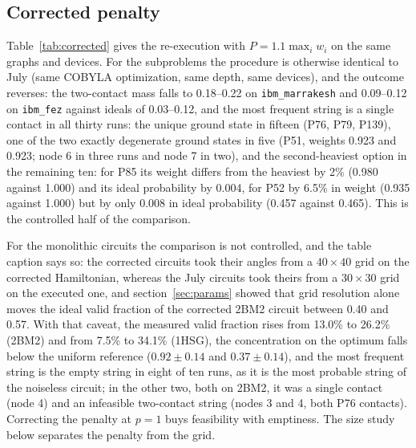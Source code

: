 \documentclass{iopjournal}
\begin{document}
\subsection{Corrected penalty}
\label{sec:res_corr}
Table~\ref{tab:corrected} gives the re-execution with $P = 1.1\max_i w_i$ on the same graphs and devices. For the subproblems the procedure is otherwise identical to July (same COBYLA optimization, same depth, same devices), and the outcome reverses: the two-contact mass falls to 0.18--0.22 on \texttt{ibm\_marrakesh} and 0.09--0.12 on \texttt{ibm\_fez} against ideals of 0.03--0.12, and the most frequent string is a single contact in all thirty runs: the unique ground state in fifteen (P76, P79, P139), one of the two exactly degenerate ground states in five (P51, weights 0.923 and 0.923; node 6 in three runs and node 7 in two), and the second-heaviest option in the remaining ten: for P85 its weight differs from the heaviest by 2\% (0.980 against 1.000) and its ideal probability by 0.004, for P52 by 6.5\% in weight (0.935 against 1.000) but by only 0.008 in ideal probability (0.457 against 0.465). This is the controlled half of the comparison.

For the monolithic circuits the comparison is not controlled, and the table caption says so: the corrected circuits took their angles from a $40\times40$ grid on the corrected Hamiltonian, whereas the July circuits took theirs from a $30\times30$ grid on the executed one, and section~\ref{sec:params} showed that grid resolution alone moves the ideal valid fraction of the corrected 2BM2 circuit between 0.40 and 0.57. With that caveat, the measured valid fraction rises from 13.0\% to 26.2\% (2BM2) and from 7.5\% to 34.1\% (1HSG), the concentration on the optimum falls below the uniform reference ($0.92 \pm 0.14$ and $0.37 \pm 0.14$), and the most frequent string is the empty string in eight of ten runs, as it is the most probable string of the noiseless circuit; in the other two, both on 2BM2, it was a single contact (node 4) and an infeasible two-contact string (nodes 3 and 4, both P76 contacts). Correcting the penalty at $p=1$ buys feasibility with emptiness. The size study below separates the penalty from the grid.
\end{document}

